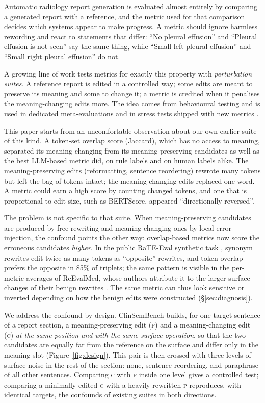\documentclass[11pt]{article}
\newcommand{\bench}{ClinSemBench\xspace}
\newcommand{\Pc}{\textsc{p}\xspace}
\newcommand{\Cc}{\textsc{c}\xspace}
\begin{document}
Automatic radiology report generation is evaluated almost entirely by comparing a generated report with a reference, and the metric used for that comparison decides which systems appear to make progress.
A metric should ignore harmless rewording and react to statements that differ: ``No pleural effusion'' and ``Pleural effusion is not seen'' say the same thing, while ``Small left pleural effusion'' and ``Small right pleural effusion'' do not.

A growing line of work tests metrics for exactly this property with \emph{perturbation suites}.
A reference report is edited in a controlled way; some edits are meant to preserve its meaning and some to change it; a metric is credited when it penalises the meaning-changing edits more. The idea comes from behavioural testing \citep{ribeiro-etal-2020-beyond,sai-etal-2021-perturbation} and is used in dedicated meta-evaluations \citep{reevalmed-2025} and in stress tests shipped with new metrics \citep{zhao-etal-2024-ratescore,radsem-2026,radot-2026}.

This paper starts from an uncomfortable observation about our own earlier suite of this kind.
A token-set overlap score (Jaccard), which has no access to meaning, separated its meaning-changing from its meaning-preserving candidates as well as the best LLM-based metric did, on rule labels and on human labels alike.
The meaning-preserving edits (reformatting, sentence reordering) rewrote many tokens but left the bag of tokens intact; the meaning-changing edits replaced one word.
A metric could earn a high score by counting changed tokens, and one that is proportional to edit size, such as BERTScore, appeared ``directionally reversed''.

The problem is not specific to that suite.
When meaning-preserving candidates are produced by free rewriting and meaning-changing ones by local error injection, the confound points the other way: overlap-based metrics now score the erroneous candidates \emph{higher}.
In the public RaTE-Eval synthetic task \citep{zhao-etal-2024-ratescore}, synonym rewrites edit twice as many tokens as ``opposite'' rewrites, and token overlap prefers the opposite in 85\% of triplets; the same pattern is visible in the per-metric averages of ReEvalMed, whose authors attribute it to the larger surface changes of their benign rewrites \citep{reevalmed-2025}.
The same metric can thus look sensitive or inverted depending on how the benign edits were constructed (\S\ref{sec:diagnosis}).

We address the confound by design.
\bench builds, for one target sentence of a report section, a meaning-preserving edit (\Pc) and a meaning-changing edit (\Cc) \emph{at the same position and with the same surface operation}, so that the two candidates are equally far from the reference on the surface and differ only in the meaning slot (Figure~\ref{fig:design}).
This pair is then crossed with three levels of surface noise in the rest of the section: none, sentence reordering, and paraphrase of all other sentences.
Comparing \Cc with \Pc inside one level gives a controlled test; comparing a minimally edited \Cc with a heavily rewritten \Pc reproduces, with identical targets, the confounds of existing suites in both directions.
\end{document}
